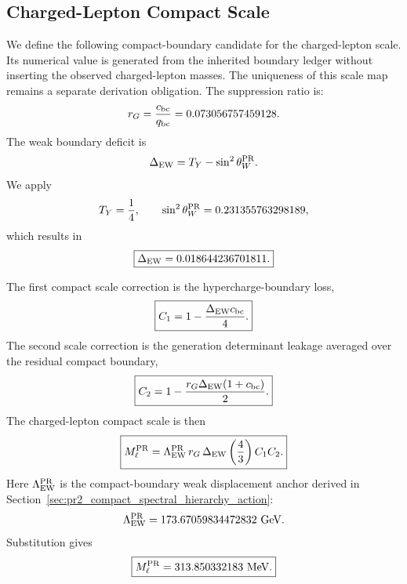 \documentclass[11pt]{article}
\begin{document}
\subsection{Charged-Lepton Compact Scale}
\label{sec:pr2_charged_lepton_compact_scale}
We define the following compact-boundary candidate for the charged-lepton scale. Its numerical value is generated from the inherited boundary ledger without inserting the observed charged-lepton masses. The uniqueness of this scale map remains a separate derivation obligation. The suppression ratio is:
\begin{equation}
r_G
=
\frac{c_{\rm bc}}{q_{\rm bc}}
=
0.073056757459128.
\end{equation}
The weak boundary deficit is
\begin{equation}
\Delta_{\rm EW}
=
T_Y-\sin^2\theta_W^{\rm PR}.
\end{equation}
We apply
\begin{equation}
T_Y=\frac14,
\qquad
\sin^2\theta_W^{\rm PR}
=
0.231355763298189,
\end{equation}
which results in
\begin{equation}
\boxed{
\Delta_{\rm EW}
=
0.018644236701811.
}
\end{equation}

The first compact scale correction is the hypercharge-boundary loss,
\begin{equation}
\boxed{
C_1
=
1-\frac{\Delta_{\rm EW}c_{\rm bc}}{4}.
}
\end{equation}
The second scale correction is the generation determinant leakage averaged over the residual compact boundary,
\begin{equation}
\boxed{
C_2
=
1-
\frac{
r_G\Delta_{\rm EW}(1+c_{\rm bc})
}{2}.
}
\end{equation}
The charged-lepton compact scale is then
\begin{equation}
\boxed{
M_\ell^{\rm PR}
=
\Lambda_{\rm EW}^{\rm PR}
\,r_G\,\Delta_{\rm EW}
\left(
\frac43
\right)
C_1C_2.
}
\end{equation}
Here \(\Lambda_{\rm EW}^{\rm PR}\) is the compact-boundary weak displacement anchor derived in Section~\ref{sec:pr2_compact_spectral_hierarchy_action}:
\begin{equation}
\Lambda_{\rm EW}^{\rm PR}
=
173.67059834472832\ {\rm GeV}.
\end{equation}
Substitution gives
\begin{equation}
\boxed{
M_\ell^{\rm PR}
=
313.850332183\ {\rm MeV}.
}
\end{equation}
\end{document}

